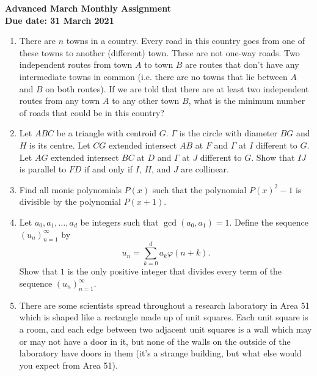 \documentclass{article}
\begin{document}
\thispagestyle{empty}

\begin{center}
  \textbf{\Large Advanced March Monthly Assignment}
  \\ \vspace{1em}
  \textbf{\large Due date: 31 March 2021}
\end{center}

\vfill
\vfill

\begin{enumerate}[1.]

\vfill
\item %
There are $n$ towns in a country.
Every road in this country goes from one of these towns to another (different) town. These are not one-way roads.
Two independent routes from town $A$ to town $B$ are routes that don't have any intermediate towns in common (i.e. there are no towns that lie between $A$ and $B$ on both routes).
If we are told that there are at least two independent routes from any town $A$ to any other town $B$, what is the minimum number of roads that could be in this country?


\vfill
\item %
Let $ABC$ be a triangle with centroid $G$.
$\Gamma$ is the circle with diameter $BG$ and $H$ is its centre.
Let $CG$ extended intersect $AB$ at $F$ and $\Gamma$ at $I$ different to $G$.
Let $AG$ extended intersect $BC$ at $D$ and $\Gamma$ at $J$ different to $G$. Show that $IJ$ is parallel to $FD$ if and only if $I$, $H$, and $J$ are collinear.


\vfill
\item %
Find all monic polynomials $P(x)$ such that the polynomial $P(x)^2-1$ is divisible by the polynomial $P(x+1)$.


\vfill
\item %
Let $a_0, a_1, \dots, a_d$ be integers such that $\gcd(a_0, a_1) = 1$. Define the sequence $(u_n)_{n=1}^{\infty}$ by
\[
  u_n = \sum_{k = 0}^{d} a_k \varphi(n + k).
\]
Show that $1$ is the only positive integer that divides every term of the sequence $(u_n)_{n = 1}^{\infty}$.


\vfill
\item %
There are some scientists spread throughout a research laboratory in Area 51 which is shaped like a rectangle made up of unit squares.
Each unit square is a room, and each edge between two adjacent unit squares is a wall which may or may not have a door in it, but none of the walls on the outside of the laboratory have doors in them (it's a strange building, but what else would you expect from Area 51).


\end{enumerate}
\end{document}

